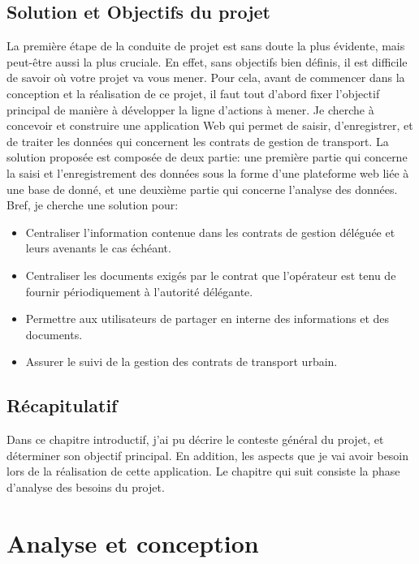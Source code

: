 \documentclass[a4paper]{report}
\begin{document}
\begin{doublespace}
    \section{Solution et Objectifs du projet}
    La première étape de la conduite de projet est sans doute la plus évidente, mais peut-être
    aussi la plus cruciale. En effet, sans objectifs bien définis, il est difficile de savoir où votre projet
    va vous mener. Pour cela, avant de commencer dans la conception et la réalisation de ce projet,
    il faut tout d’abord fixer l’objectif principal de manière à développer la ligne d’actions à mener.
    Je cherche à concevoir et construire une application Web qui permet de saisir, d'enregistrer,
    et de traiter les données qui concernent les contrats de gestion de transport. La
    solution proposée est composée de deux partie: une première partie qui concerne la
    saisi et l'enregistrement des données sous la forme d'une plateforme web liée à une
    base de donné, et une deuxième partie qui concerne l'analyse des données.
    Bref, je cherche une solution pour:
    \begin{itemize}
        \item Centraliser l’information contenue dans les contrats de gestion déléguée et
              leurs avenants le cas échéant.
        \item Centraliser les documents exigés par le contrat que l’opérateur est tenu de
              fournir périodiquement à l’autorité délégante.
        \item Permettre aux utilisateurs de partager en interne des informations et des
              documents.
        \item Assurer le suivi de la gestion des contrats de transport urbain.
    \end{itemize}
    \newpage
    \section{Récapitulatif }
    Dans ce chapitre introductif, j'ai pu décrire le conteste général du projet, et
    déterminer son objectif principal. En addition, les aspects que je vai
    avoir besoin lors de la réalisation de cette application.
    Le chapitre qui suit consiste la phase d'analyse des besoins du projet.
    \newpage
    \chapter{Analyse et conception}

    \renewcommand{\headrulewidth}{1pt}
    \fancyhead[L]{\hspace*{5cm}}
    \begin{doublespace}


\end{doublespace}
\end{doublespace}
\end{document}

